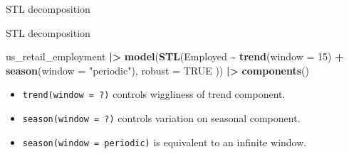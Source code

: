 \documentclass[
  14pt,
  ignorenonframetext,
  aspectratio=169,
]{beamer}
\newenvironment{Shaded}{\begin{snugshade}}{\end{snugshade}}
\newcommand{\AttributeTok}[1]{\textcolor[rgb]{0.13,0.29,0.53}{#1}}
\newcommand{\ConstantTok}[1]{\textcolor[rgb]{0.56,0.35,0.01}{#1}}
\newcommand{\DecValTok}[1]{\textcolor[rgb]{0.00,0.00,0.81}{#1}}
\newcommand{\FunctionTok}[1]{\textcolor[rgb]{0.13,0.29,0.53}{\textbf{#1}}}
\newcommand{\NormalTok}[1]{#1}
\newcommand{\SpecialCharTok}[1]{\textcolor[rgb]{0.81,0.36,0.00}{\textbf{#1}}}
\newcommand{\StringTok}[1]{\textcolor[rgb]{0.31,0.60,0.02}{#1}}
\providecommand{\tightlist}{%
  \setlength{\itemsep}{0pt}\setlength{\parskip}{0pt}}
\renewenvironment{Shaded}{\vspace*{0.15cm}\color{black}\fontsize{10}{10}\sf\begin{snugshade}\color{black}}{\end{snugshade}}
\begin{document}
\begin{frame}{STL decomposition}
\protect{}\label{stl-decomposition-1}

\vspace*{10cm}
\end{frame}

\begin{frame}[fragile]{STL decomposition}
\protect{}\label{stl-decomposition-2}
\begin{Shaded}
\begin{Highlighting}[]
\NormalTok{us\_retail\_employment }\SpecialCharTok{|\textgreater{}}
  \FunctionTok{model}\NormalTok{(}\FunctionTok{STL}\NormalTok{(Employed }\SpecialCharTok{\textasciitilde{}} \FunctionTok{trend}\NormalTok{(}\AttributeTok{window =} \DecValTok{15}\NormalTok{) }\SpecialCharTok{+} \FunctionTok{season}\NormalTok{(}\AttributeTok{window =} \StringTok{"periodic"}\NormalTok{),}
    \AttributeTok{robust =} \ConstantTok{TRUE}
\NormalTok{  )) }\SpecialCharTok{|\textgreater{}}
  \FunctionTok{components}\NormalTok{()}
\end{Highlighting}
\end{Shaded}

\fontsize{12}{13}\sf

\begin{itemize}
\tightlist
\item
  \texttt{trend(window\ =\ ?)} controls wiggliness of trend component.
\item
  \texttt{season(window\ =\ ?)} controls variation on seasonal
  component.
\item
  \texttt{season(window\ =\ \textquotesingle{}periodic\textquotesingle{})}
  is equivalent to an infinite window.
\end{itemize}
\end{frame}
\end{document}

